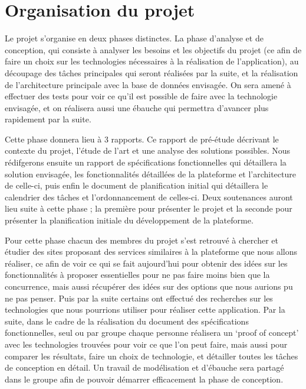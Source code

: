 \section{Organisation du projet}
\label{sec:organisation}
    Le projet s’organise en deux phases distinctes. La phase d’analyse et de conception, qui consiste à analyser
    les besoins et les objectifs du projet (ce afin de faire un choix sur les technologies
    nécessaires à la réalisation de l’application), au découpage des tâches principales
    qui seront réalisées par la suite, et la réalisation de l’architecture principale avec
    la base de données envisagée. On sera amené
    à effectuer des tests pour voir ce qu’il est possible de faire avec la technologie envisagée,
    et on réalisera aussi une ébauche qui permettra d’avancer plus rapidement par la suite.

    Cette phase donnera lieu à 3 rapports. Ce rapport de pré-étude décrivant le contexte du projet,
    l’étude de l’art et une analyse des solutions possibles. Nous rédifgerons ensuite un  rapport de spécifications fonctionnelles
    qui détaillera la solution envisagée, les fonctionnalités détaillées de la plateforme et l’architecture
    de celle-ci, puis enfin le document de planification initial qui détaillera le calendrier des tâches
    et l’ordonnancement de celles-ci. Deux soutenances auront lieu suite à cette phase ; la première pour
    présenter le projet et la seconde pour présenter la planification initiale du développement de la plateforme.

    Pour cette phase chacun des membres du projet s’est retrouvé à chercher et étudier des sites proposant
    des services similaires à la plateforme que nous allons réaliser, ce afin de voir ce qui se fait aujourd’hui
    pour obtenir des idées sur les fonctionnalités à proposer essentielles pour ne pas faire moins bien
    que la concurrence, mais aussi récupérer des idées sur des options que nous aurions pu ne pas penser.
    Puis par la suite certains ont effectué des recherches sur les technologies que nous pourrions utiliser
    pour réaliser cette application. Par la suite, dans le cadre de la réalisation du document des spécifications
    fonctionnelles, seul ou par groupe chaque personne réalisera un ‘proof of concept’ avec les technologies trouvées
    pour voir ce que l’on peut faire, mais aussi pour comparer les résultats, faire un choix de technologie,
    et détailler toutes les tâches de conception en détail. Un travail de modélisation et d’ébauche sera partagé
    dans le groupe afin de pouvoir démarrer efficacement la phase de conception.

